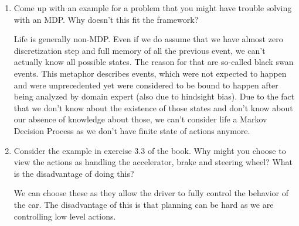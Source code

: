 \documentclass{exam}
\begin{document}
\begin{problem}
\begin{enumerate}
\begin{enumerate}
    \item Come up with an example for a problem that you might have trouble solving with an MDP. Why doesn’t this fit the framework?
    \begin{solutionorlines}[2in]
        
        
        Life is generally non-MDP. Even if we do assume that we have almost zero discretization step and full memory of all the previous event, we can't actually know all possible states. The reason for that are so-called black swan events. This metaphor describes events, which were not expected to happen and were unprecedented yet were considered to be bound to happen after being analyzed by domain expert (also due to hindsight bias). 
        Due to the fact that we don't know about the existence of those states and don't know about our absence of knowledge about those, we can't consider life a Markov Decision Process as we don't have finite state of actions anymore.
    \end{solutionorlines}
    
    \item Consider the example in exercise 3.3 of the book. Why might you choose to view the actions as handling the accelerator, brake and steering wheel? What is the disadvantage of doing this?
    \begin{solutionorlines}[2in]
        We can choose these as they allow the driver to fully control the behavior of the car. The disadvantage of this is that planning can be hard as we are controlling low level actions.
    \end{solutionorlines}
    

\end{enumerate}
\end{enumerate}
\end{problem}
\end{document}
